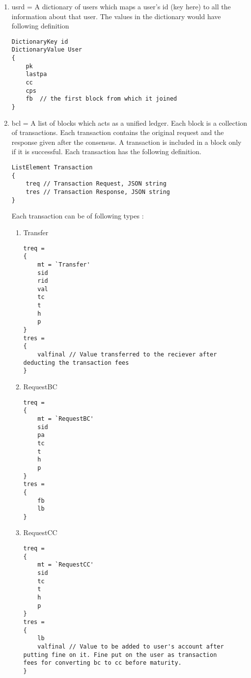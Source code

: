 {\begin{enumerate}
\begin{verbatim}
QueueElement BCUser
{
    id // ID of the user
    pk // Public Key of the user
    pa // Public Address of the user
    fb // first Block giving consensus
    lb // last Block giving consensus
    active // 1 if user is participating in consensus
}
\end{verbatim}
    \item usrd = A dictionary of users which maps a user's id (key here) to all the information about that user.
The values in the dictionary would have following definition
\begin{verbatim}
DictionaryKey id
DictionaryValue User
{
    pk
    lastpa
    cc
    cps
    fb  // the first block from which it joined
}
\end{verbatim}
    \item bcl = A list of blocks which acts as a unified ledger. Each block is a collection of transactions. Each transaction contains the original request and the response given after the consensus. A transaction is included in a block only if it is successful.
Each transaction has the following definition.
\begin{verbatim}
ListElement Transaction
{
    treq // Transaction Request, JSON string
    tres // Transaction Response, JSON string
}
\end{verbatim}
Each transaction can be of following types :
    \begin{enumerate}
        \item Transfer
        \begin{verbatim}
treq = 
{
    mt = `Transfer'
    sid
    rid
    val
    tc
    t
    h
    p
}
tres = 
{
    valfinal // Value transferred to the reciever after 
deducting the transaction fees
}
        \end{verbatim}
        \item RequestBC
        \begin{verbatim}
treq = 
{
    mt = `RequestBC'
    sid
    pa
    tc
    t
    h
    p
}
tres = 
{
    fb
    lb
}
        \end{verbatim}
        \item RequestCC
        \begin{verbatim}
treq = 
{
    mt = `RequestCC'
    sid
    tc
    t
    h
    p
}
tres =
{
    lb
    valfinal // Value to be added to user's account after 
putting fine on it. Fine put on the user as transaction 
fees for converting bc to cc before maturity.
}    
        \end{verbatim}

\end{enumerate}
\end{enumerate}}
